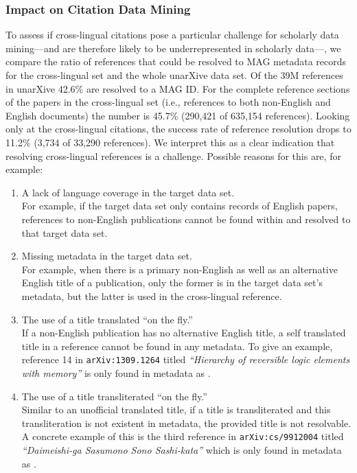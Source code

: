 \subsubsection{Impact on Citation Data Mining}

To assess if cross-lingual citations pose a particular challenge for scholarly data mining---and are therefore likely to be underrepresented in scholarly data---, we compare the ratio of references that could be resolved to MAG metadata records for the cross-lingual set and the whole unarXive data set. Of the 39M references in unarXive 42.6\% are resolved to a MAG ID. For the complete reference sections of the papers in the cross-lingual set (i.e., references to both non-English and English documents) the number is 45.7\% (290,421 of 635,154 references). Looking only at the cross-lingual citations, the success rate of reference resolution drops to 11.2\% (3,734 of 33,290 references). We interpret this as a clear indication that resolving cross-lingual references is a challenge. Possible reasons for this are, for example:
\begin{enumerate}
\item A lack of language coverage in the target data set.\\For example, if the target data set only contains records of English papers, references to non-English publications cannot be found within and resolved to that target data set.
\item Missing metadata in the target data set.\\For example, when there is a primary non-English as well as an alternative English title of a publication, only the former is in the target data set's metadata, but the latter is used in the cross-lingual reference.
\item The use of a title translated ``on the fly.''\\If a non-English publication has no alternative English title, a self translated title in a reference cannot be found in any metadata. To give an example, reference 14 in \texttt{arXiv:1309.1264} titled \textit{``Hierarchy of reversible logic elements with memory''} is only found in metadata as .
\item The use of a title transliterated ``on the fly.''\\Similar to an unofficial translated title, if a title is transliterated and this transliteration is not existent in metadata, the provided title is not resolvable. A concrete example of this is the third reference in \texttt{arXiv:cs/9912004} titled \textit{``Daimeishi-ga Sasumono Sono Sashi-kata''} which is only found in metadata as .
\end{enumerate}

